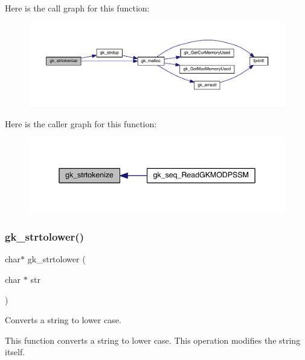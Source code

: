 Here is the call graph for this function\+:\nopagebreak
\begin{figure}[H]
\begin{center}
\leavevmode
\includegraphics[width=350pt]{a00077_a10256e3a692ac19ff5056d1dc413bd29_cgraph}
\end{center}
\end{figure}
Here is the caller graph for this function\+:\nopagebreak
\begin{figure}[H]
\begin{center}
\leavevmode
\includegraphics[width=342pt]{a00077_a10256e3a692ac19ff5056d1dc413bd29_icgraph}
\end{center}
\end{figure}
\mbox{\label{a00077_aa9694040c894f358a61954076374a04e}} 
\subsubsection{\texorpdfstring{gk\+\_\+strtolower()}{gk\_strtolower()}}
{\footnotesize\ttfamily char$\ast$ gk\+\_\+strtolower (\begin{DoxyParamCaption}\item[{char $\ast$}]{str }\end{DoxyParamCaption})}



Converts a string to lower case. 

This function converts a string to lower case. This operation modifies the string itself.


